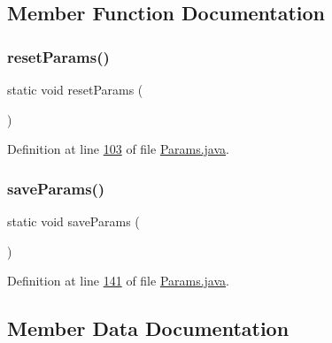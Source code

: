 \subsection{Member Function Documentation}
\hypertarget{classdata_1_1_params_a0a4fc9bb0ad6624d84e20d1cd9644187}{}\label{classdata_1_1_params_a0a4fc9bb0ad6624d84e20d1cd9644187} 
\subsubsection{\texorpdfstring{reset\+Params()}{resetParams()}}
{\footnotesize\ttfamily static void reset\+Params (\begin{DoxyParamCaption}{ }\end{DoxyParamCaption})\hspace{0.3cm}{\ttfamily [static]}}



Definition at line \hyperlink{_params_8java_source_l00103}{103} of file \hyperlink{_params_8java_source}{Params.\+java}.

\hypertarget{classdata_1_1_params_a523f79a85b888809ee8b6220ef0e20d1}{}\label{classdata_1_1_params_a523f79a85b888809ee8b6220ef0e20d1} 
\subsubsection{\texorpdfstring{save\+Params()}{saveParams()}}
{\footnotesize\ttfamily static void save\+Params (\begin{DoxyParamCaption}{ }\end{DoxyParamCaption})\hspace{0.3cm}{\ttfamily [static]}}



Definition at line \hyperlink{_params_8java_source_l00141}{141} of file \hyperlink{_params_8java_source}{Params.\+java}.



\subsection{Member Data Documentation}
\hypertarget{classdata_1_1_params_a42568ad774d8f4ccb9535aeda39fc883}{}\label{classdata_1_1_params_a42568ad774d8f4ccb9535aeda39fc883} 
